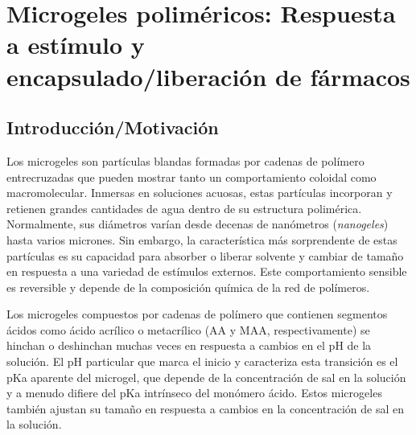 
\chapter{Microgeles polim\'ericos: Respuesta a est\'imulo y encapsulado/liberaci\'on de f\'armacos} %

\label{Chapter-geles} %


\newcommand{\keyword}[1]{\textbf{#1}}
\newcommand{\tabhead}[1]{\textbf{#1}}
\newcommand{\code}[1]{\texttt{#1}}
\newcommand{\file}[1]{\texttt{\bfseries#1}}
\newcommand{\option}[1]{\texttt{\itshape#1}}





\section{Introducci\'on/Motivaci\'on}


Los microgeles son part\'iculas blandas formadas por cadenas de pol\'imero entrecruzadas que pueden mostrar tanto un comportamiento coloidal como macromolecular\cite{plamper2017functional,lyon2012polymer}.
Inmersas en soluciones acuosas, estas part\'iculas incorporan y retienen grandes cantidades de agua dentro de su estructura polim\'erica.
Normalmente, sus di\'ametros var\'ian desde decenas de nan\'ometros (\emph{nanogeles}) hasta varios micrones.
Sin embargo, la caracter\'istica m\'as sorprendente de estas part\'iculas es su capacidad para absorber o liberar solvente y cambiar de tama\~no en respuesta a una variedad de est\'imulos externos.
Este comportamiento sensible es reversible y depende de la composici\'on qu\'imica de la red de pol\'imeros.

Los microgeles compuestos por cadenas de pol\'imero que contienen segmentos \'acidos como \'acido acr\'ilico o metacr\'ilico (AA y MAA, respectivamente) se hinchan o deshinchan muchas veces en respuesta a cambios en el pH de la solución\cite{snowden1996colloidal,Zhou1998}.
El pH particular que marca el inicio y caracteriza esta transición es el pKa aparente del microgel, que depende de la concentraci\'on de sal en la soluci\'on y a menudo difiere del pKa intr\'inseco del mon\'omero \'acido.
Estos microgeles tambi\'en ajustan su tama\~no en respuesta a cambios en la concentraci\'on de sal en la soluci\'on\cite{snowden1996colloidal}.

